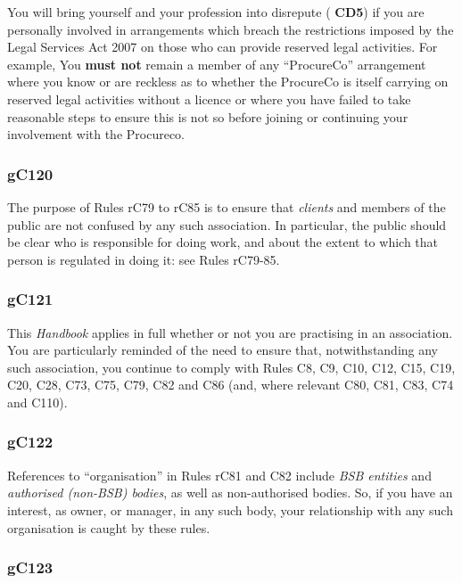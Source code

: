 You will bring yourself and your profession into disrepute ( \textbf{\textcolor{mygold}{CD5}}) if you
are personally involved in arrangements which breach the restrictions
imposed by the Legal Services Act 2007 on those who can provide reserved
legal activities. For example, You \textcolor{myred}{\textbf{must not}} remain a member of any
``ProcureCo'' arrangement where you know or are reckless as to whether
the ProcureCo is itself carrying on reserved legal activities without a
licence or where you have failed to take reasonable steps to ensure this
is not so before joining or continuing your involvement with the
Procureco.

\subsubsection{\color{darkgrey}gC120}

The purpose of Rules rC79 to rC85 is to ensure that \emph{clients} and
members of the public are not confused by any such association. In
particular, the public should be clear who is responsible for doing
work, and about the extent to which that person is regulated in doing
it: see Rules rC79-85.

\subsubsection{\color{darkgrey}gC121}

This \emph{Handbook} applies in full whether or not you are practising
in an association. You are particularly reminded of the need to ensure
that, notwithstanding any such association, you continue to comply with
Rules C8, C9, C10, C12, C15, C19, C20, C28, C73, C75, C79, C82 and C86
(and, where relevant C80, C81, C83, C74 and C110).

\subsubsection{\color{darkgrey}gC122}

References to ``organisation'' in Rules rC81 and C82 include \emph{BSB
entities} and \emph{authorised (non-BSB) bodies}, as well as
non-authorised bodies. So, if you have an interest, as owner, or
manager, in any such body, your relationship with any such organisation
is caught by these rules.

\subsubsection{\color{darkgrey}gC123}

